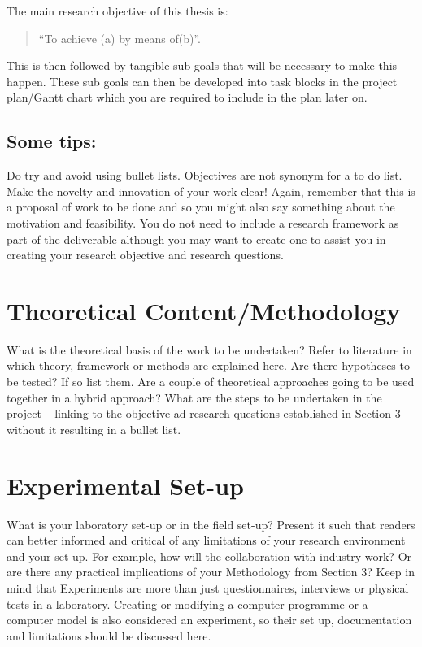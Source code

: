 \documentclass[12pt, english, NoHyper]{AE4010-template}
\begin{document}
\noindent The main research objective of this thesis is:

\begin{quote}
“To achieve (a) by means of(b)”.
\cite{Verschuren}    
\end{quote}


\noindent This is then followed by tangible sub-goals that will be necessary to make this happen. These sub goals can then be developed into task blocks in the project plan/Gantt chart which you are required to include in the plan later on. 





\subsection{Some tips:}
Do try and avoid using bullet lists. Objectives are not synonym for a to do list. Make the novelty and innovation of your work clear! Again, remember that this is a proposal of work to be done and so you might also say something about the motivation and feasibility. You do not need to include a research framework as part of the deliverable although you may want to create one to assist you in creating your research objective and research questions.





\section{Theoretical Content/Methodology}
What is the theoretical basis of the work to be undertaken? Refer to literature in which theory, framework or methods are explained here. Are there hypotheses to be tested? If so list them. Are a couple of theoretical approaches going to be used together in a hybrid approach? What are the steps to be undertaken in the project – linking to the objective ad research questions established in Section 3 without it resulting in a bullet list.





\section{Experimental Set-up}
What is your laboratory set-up or in the field set-up? Present it such that readers can better informed and critical of any limitations of your research environment and your set-up. For example, how will the collaboration with industry work? Or are there any practical implications of your Methodology from Section 3? Keep in mind that Experiments are more than just questionnaires, interviews or physical tests in a laboratory. Creating or modifying a computer programme or a computer model is also considered an experiment, so their set up, documentation and limitations should be discussed here. 
\end{document}
